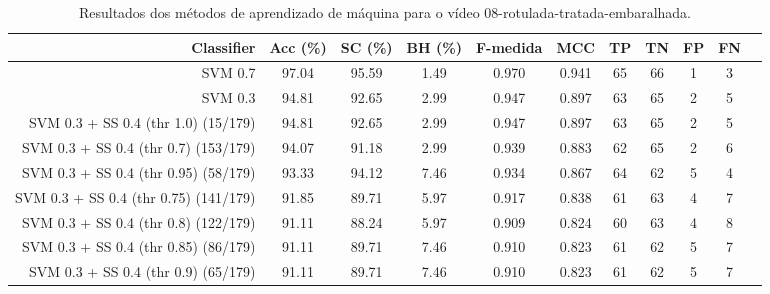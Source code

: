 \begin{table}[!htb]
\centering
\caption{Resultados dos métodos de aprendizado de máquina para o vídeo 08-rotulada-tratada-embaralhada.}
\label{tab:08-rotulada-tratada-embaralhada}
\begin{tabular}{r|c|c|c|c|c|c|c|c|c|c}
\hline\hline
Classifier & Acc (\%) & SC (\%) & BH (\%) & F-medida & MCC & TP & TN & FP & FN \\ \hline
SVM 0.7 & 97.04 & 95.59 & 1.49 & 0.970 & 0.941 & 65 & 66 & 1 & 3 \\ 
SVM 0.3 & 94.81 & 92.65 & 2.99 & 0.947 & 0.897 & 63 & 65 & 2 & 5 \\ 
SVM 0.3 + SS 0.4 (thr 1.0) (15/179) & 94.81 & 92.65 & 2.99 & 0.947 & 0.897 & 63 & 65 & 2 & 5 \\ 
SVM 0.3 + SS 0.4 (thr 0.7) (153/179) & 94.07 & 91.18 & 2.99 & 0.939 & 0.883 & 62 & 65 & 2 & 6 \\ 
SVM 0.3 + SS 0.4 (thr 0.95) (58/179) & 93.33 & 94.12 & 7.46 & 0.934 & 0.867 & 64 & 62 & 5 & 4 \\ 
SVM 0.3 + SS 0.4 (thr 0.75) (141/179) & 91.85 & 89.71 & 5.97 & 0.917 & 0.838 & 61 & 63 & 4 & 7 \\ 
SVM 0.3 + SS 0.4 (thr 0.8) (122/179) & 91.11 & 88.24 & 5.97 & 0.909 & 0.824 & 60 & 63 & 4 & 8 \\ 
SVM 0.3 + SS 0.4 (thr 0.85) (86/179) & 91.11 & 89.71 & 7.46 & 0.910 & 0.823 & 61 & 62 & 5 & 7 \\ 
SVM 0.3 + SS 0.4 (thr 0.9) (65/179) & 91.11 & 89.71 & 7.46 & 0.910 & 0.823 & 61 & 62 & 5 & 7 \\ 
\hline\hline
\end{tabular}
\end{table}

